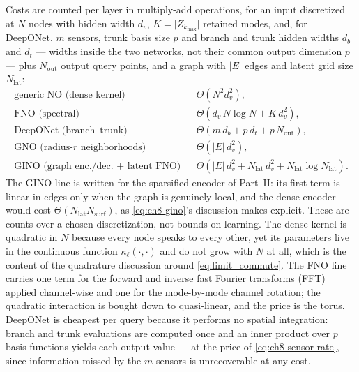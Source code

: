 Costs are counted per layer in multiply-add operations, for an input discretized at $N$ nodes with hidden width $d_v$, $K=\lvert Z_{k_{\max}}\rvert$ retained modes, and, for DeepONet, $m$ sensors, trunk basis size $p$ and branch and trunk hidden widths $d_b$ and $d_t$ --- widths inside the two networks, not their common output dimension $p$ --- plus $N_{\mathrm{out}}$ output query points, and a graph with $|E|$ edges and latent grid size $N_{\mathrm{lat}}$:
\begin{equation}
  \label{eq:ch8-costs}
  \begin{aligned}
    \text{generic NO (dense kernel)} & & \Theta\!\left(N^{2}d_v^{2}\right), \\
    \text{FNO (spectral)} & & \Theta\!\left(d_v\,N\log N + K\,d_v^{2}\right), \\
    \text{DeepONet (branch--trunk)} & & \Theta\!\left(m\,d_b + p\,d_t + p\,N_{\mathrm{out}}\right), \\
    \text{GNO (radius-}r\text{ neighborhoods)} & & \Theta\!\left(|E|\,d_v^{2}\right), \\
    \text{GINO (graph enc./dec.\ + latent FNO)} & & \Theta\!\left(|E|\,d_v^{2} + N_{\mathrm{lat}}\,d_v^{2} + N_{\mathrm{lat}}\log N_{\mathrm{lat}}\right).
  \end{aligned}
\end{equation}
The GINO line is written for the sparsified encoder of Part~II: its first term is linear
in edges only when the graph is genuinely local, and the dense encoder would cost
$\Theta(N_{\mathrm{lat}}N_{\mathrm{surf}})$, as \eqref{eq:ch8-gino}'s discussion makes
explicit.
These are counts over a chosen discretization, not bounds on learning. The dense kernel is quadratic in $N$ because every node speaks to every other, yet its parameters live in the continuous function $\kappa_\ell(\cdot,\cdot)$ and do not grow with $N$ at all, which is the content of the quadrature discussion around \eqref{eq:limit_commute}. The FNO line carries one term for the forward and inverse fast Fourier transforms (FFT) applied channel-wise and one for the mode-by-mode channel rotation; the quadratic interaction is bought down to quasi-linear, and the price is the torus. DeepONet is cheapest per query because it performs no spatial integration: branch and trunk evaluations are computed once and an inner product over $p$ basis functions yields each output value --- at the price of \eqref{eq:ch8-sensor-rate}, since information missed by the $m$ sensors is unrecoverable at any cost.

